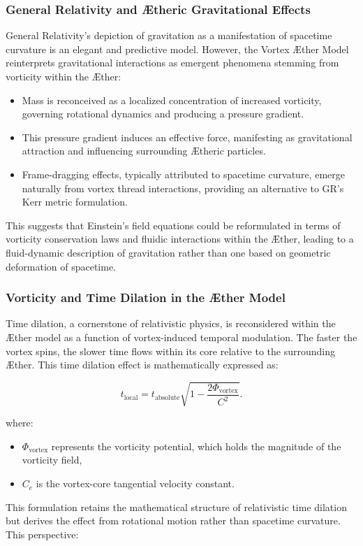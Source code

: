 \subsubsection*{General Relativity and Ætheric Gravitational Effects}
General Relativity's depiction of gravitation as a manifestation of spacetime curvature is an elegant and predictive model.
However, the Vortex Æther Model reinterprets gravitational interactions as emergent phenomena stemming from vorticity within the Æther:

\begin{itemize}
    \item Mass is reconceived as a localized concentration of increased vorticity, governing rotational dynamics and producing a pressure gradient.
    \item This pressure gradient induces an effective force, manifesting as gravitational attraction and influencing surrounding Ætheric particles.
    \item Frame-dragging effects, typically attributed to spacetime curvature, emerge naturally from vortex thread interactions, providing an alternative to GR’s Kerr metric formulation.
\end{itemize}
This suggests that Einstein's field equations could be reformulated in terms of vorticity conservation laws and fluidic interactions within the Æther, leading to a fluid-dynamic description of gravitation rather than one based on geometric deformation of spacetime.

\subsubsection*{Vorticity and Time Dilation in the Æther Model}
Time dilation, a cornerstone of relativistic physics, is reconsidered within the Æther model as a function of vortex-induced temporal modulation.
The faster the vortex spins, the slower time flows within its core relative to the surrounding Æther.
This time dilation effect is mathematically expressed as:

\begin{equation*}
    t_{\text{local}} = t_{\text{absolute}} \sqrt{1 - \frac{2 \Phi_{\text{vortex}}}{C^2}}.\label{eq:TimeDilation}
\end{equation*}

where:

\begin{itemize}
    \item $\Phi_{\text{vortex}}$ represents the vorticity potential, which holds the magnitude of the vorticity field,
    \item $C_e$ is the vortex-core tangential velocity constant.
\end{itemize}
This formulation retains the mathematical structure of relativistic time dilation but derives the effect from rotational motion rather than spacetime curvature.
This perspective:

